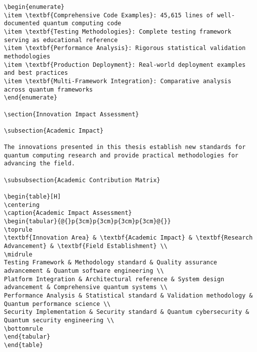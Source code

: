 \documentclass[12pt,a4paper]{report}
\begin{document}
\begin{lstlisting}
\begin{enumerate}
\item \textbf{Comprehensive Code Examples}: 45,615 lines of well-documented quantum computing code
\item \textbf{Testing Methodologies}: Complete testing framework serving as educational reference
\item \textbf{Performance Analysis}: Rigorous statistical validation methodologies
\item \textbf{Production Deployment}: Real-world deployment examples and best practices
\item \textbf{Multi-Framework Integration}: Comparative analysis across quantum frameworks
\end{enumerate}

\section{Innovation Impact Assessment}

\subsection{Academic Impact}

The innovations presented in this thesis establish new standards for quantum computing research and provide practical methodologies for advancing the field.

\subsubsection{Academic Contribution Matrix}

\begin{table}[H]
\centering
\caption{Academic Impact Assessment}
\begin{tabular}{@{}p{3cm}p{3cm}p{3cm}p{3cm}@{}}
\toprule
\textbf{Innovation Area} & \textbf{Academic Impact} & \textbf{Research Advancement} & \textbf{Field Establishment} \\
\midrule
Testing Framework & Methodology standard & Quality assurance advancement & Quantum software engineering \\
Platform Integration & Architectural reference & System design advancement & Comprehensive quantum systems \\
Performance Analysis & Statistical standard & Validation methodology & Quantum performance science \\
Security Implementation & Security standard & Quantum cybersecurity & Quantum security engineering \\
\bottomrule
\end{tabular}
\end{table}


\end{lstlisting}
\end{document}
